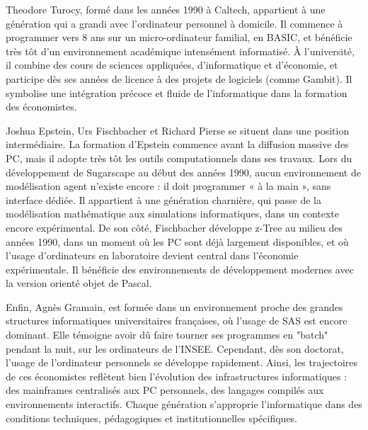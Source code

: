 Theodore Turocy, formé dans les années 1990 à Caltech, appartient à une génération qui a grandi avec l’ordinateur personnel à domicile. Il commence à programmer vers 8 ans sur un micro-ordinateur familial, en BASIC, et bénéficie très tôt d’un environnement académique intensément informatisé. À l’université, il combine des cours de sciences appliquées, d’informatique et d’économie, et participe dès ses années de licence à des projets de logiciels (comme Gambit). Il symbolise une intégration précoce et fluide de l’informatique dans la formation des économistes. 

Joshua Epstein, Urs Fischbacher et Richard Pierse se situent dans une position intermédiaire. La formation d’Epstein commence avant la diffusion massive des PC, mais il adopte très tôt les outils computationnels dans ses travaux. Lors du développement de Sugarscape au début des années 1990, aucun environnement de modélisation agent n'existe encore : il doit programmer « à la main », sans interface dédiée. Il appartient à une génération charnière, qui passe de la modélisation mathématique aux simulations informatiques, dans un contexte encore expérimental. De son côté, Fischbacher développe z-Tree au milieu des années 1990, dans un moment où les PC sont déjà largement disponibles, et où l’usage d’ordinateurs en laboratoire devient central dans l’économie expérimentale. Il bénéficie des environnements de développement modernes avec la version orienté objet de Pascal. 

Enfin, Agnès Gramain, est formée dans un environnement proche des grandes structures informatiques universitaires françaises, où l’usage de SAS est encore dominant. Elle témoigne avoir dû faire tourner ses programmes en "batch" pendant la nuit, sur les ordinateurs de l'INSEE. Cependant, dès son doctorat, l’usage de l'ordinateur personnels se développe rapidement. Ainsi, les trajectoires de ces économistes reflètent bien l’évolution des infrastructures informatiques : des mainframes centralisés aux PC personnels, des langages compilés aux environnements interactifs. Chaque génération s’approprie l’informatique dans des conditions techniques, pédagogiques et institutionnelles spécifiques.


